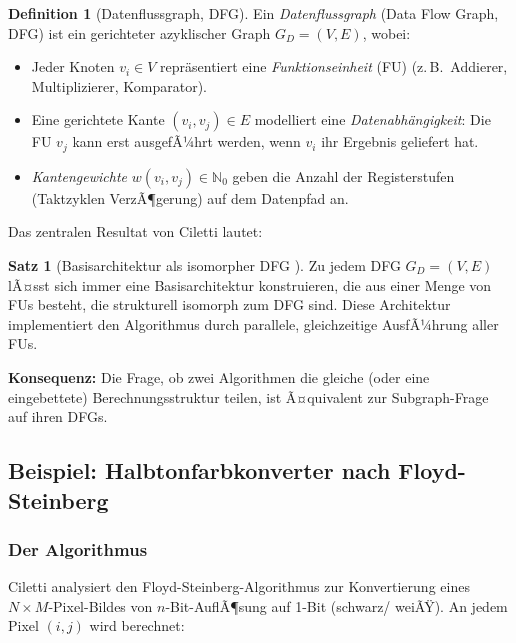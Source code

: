﻿\documentclass[a4paper,12pt]{article}
\theoremstyle{definition}
\newtheorem{definition}{Definition}
\newtheorem{satz}{Satz}
\begin{document}
\begin{definition}[Datenflussgraph, DFG]\label{def:dfg}
  Ein \emph{Datenflussgraph} (Data Flow Graph, DFG) ist ein gerichteter azyklischer
  Graph $G_D = (V, E)$, wobei:
  \begin{itemize}
    \item Jeder Knoten $v_i \in V$ repr\"asentiert eine \emph{Funktionseinheit} (FU)
          (z.\,B.\ Addierer, Multiplizierer, Komparator).
    \item Eine gerichtete Kante $(v_i, v_j) \in E$ modelliert eine
          \emph{Datenabh\"angigkeit}: Die FU $v_j$ kann erst ausgefÃ¼hrt werden, wenn
          $v_i$ ihr Ergebnis geliefert hat.
    \item \emph{Kantengewichte} $w(v_i, v_j) \in \mathbb{N}_0$ geben die Anzahl der
          Registerstufen (Taktzyklen VerzÃ¶gerung) auf dem Datenpfad an.
  \end{itemize}
\end{definition}

Das zentralen Resultat von Ciletti \cite[S.~549]{ciletti2011} lautet:

\begin{satz}[Basisarchitektur als isomorpher DFG {\cite{ciletti2011}}]\label{satz:basisarch}
  Zu jedem DFG $G_D = (V, E)$ lÃ¤sst sich immer eine Basisarchitektur konstruieren, die
  aus einer Menge von FUs besteht, die strukturell isomorph zum DFG sind. Diese
  Architektur implementiert den Algorithmus durch parallele, gleichzeitige AusfÃ¼hrung
  aller FUs.
\end{satz}

\textbf{Konsequenz:} Die Frage, ob zwei Algorithmen die gleiche (oder eine eingebettete)
Berechnungsstruktur teilen, ist Ã¤quivalent zur Subgraph-Frage auf ihren DFGs.

\subsection{Beispiel: Halbtonfarbkonverter nach Floyd-Steinberg}

\subsubsection{Der Algorithmus}

Ciletti \cite[S.~551--560]{ciletti2011} analysiert den Floyd-Steinberg-Algorithmus zur
Konvertierung eines $N \times M$-Pixel-Bildes von $n$-Bit-AuflÃ¶sung auf 1-Bit (schwarz/
weiÃŸ). An jedem Pixel $(i, j)$ wird berechnet:
\end{document}
